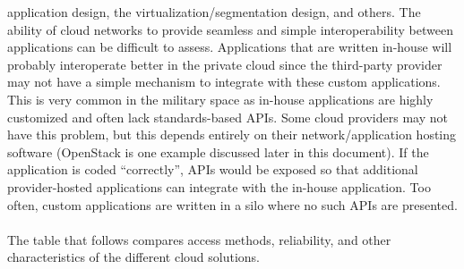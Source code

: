 application design, the virtualization/segmentation design, and others. The
ability of cloud networks to provide seamless and simple interoperability
between applications can be difficult to assess. Applications that are written
in-house will probably interoperate better in the private cloud since the
third-party provider may not have a simple mechanism to integrate with these
custom applications. This is very common in the military space as in-house
applications are highly customized and often lack standards-based APIs. Some
cloud providers may not have this problem, but this depends entirely on their
network/application hosting software (OpenStack is one example discussed later
in this document). If the application is coded ``correctly'', APIs would be
exposed so that additional provider-hosted applications can integrate with the
in-house application. Too often, custom applications are written in a silo
where no such APIs are presented.
\\ \\
The table that follows compares access methods, reliability, and other
characteristics of the different cloud solutions.
